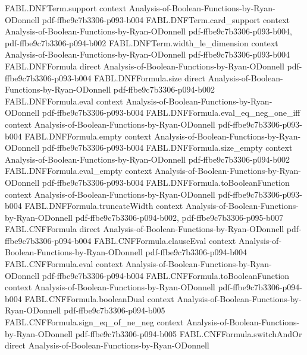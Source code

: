 \begin{theorem}
\proofstep
  {FABL.DNFTerm.support}
  {context}
  {Analysis-of-Boolean-Functions-by-Ryan-ODonnell}
  {pdf-ffbe9c7b3306-p093-b004}
\proofstep
  {FABL.DNFTerm.card_support}
  {context}
  {Analysis-of-Boolean-Functions-by-Ryan-ODonnell}
  {pdf-ffbe9c7b3306-p093-b004,
    pdf-ffbe9c7b3306-p094-b002}
\proofstep
  {FABL.DNFTerm.width_le_dimension}
  {context}
  {Analysis-of-Boolean-Functions-by-Ryan-ODonnell}
  {pdf-ffbe9c7b3306-p093-b004}
\proofstep
  {FABL.DNFFormula}
  {direct}
  {Analysis-of-Boolean-Functions-by-Ryan-ODonnell}
  {pdf-ffbe9c7b3306-p093-b004}
\proofstep
  {FABL.DNFFormula.size}
  {direct}
  {Analysis-of-Boolean-Functions-by-Ryan-ODonnell}
  {pdf-ffbe9c7b3306-p094-b002}
\proofstep
  {FABL.DNFFormula.eval}
  {context}
  {Analysis-of-Boolean-Functions-by-Ryan-ODonnell}
  {pdf-ffbe9c7b3306-p093-b004}
\proofstep
  {FABL.DNFFormula.eval_eq_neg_one_iff}
  {context}
  {Analysis-of-Boolean-Functions-by-Ryan-ODonnell}
  {pdf-ffbe9c7b3306-p093-b004}
\proofstep
  {FABL.DNFFormula.empty}
  {context}
  {Analysis-of-Boolean-Functions-by-Ryan-ODonnell}
  {pdf-ffbe9c7b3306-p093-b004}
\proofstep
  {FABL.DNFFormula.size_empty}
  {context}
  {Analysis-of-Boolean-Functions-by-Ryan-ODonnell}
  {pdf-ffbe9c7b3306-p094-b002}
\proofstep
  {FABL.DNFFormula.eval_empty}
  {context}
  {Analysis-of-Boolean-Functions-by-Ryan-ODonnell}
  {pdf-ffbe9c7b3306-p093-b004}
\proofstep
  {FABL.DNFFormula.toBooleanFunction}
  {context}
  {Analysis-of-Boolean-Functions-by-Ryan-ODonnell}
  {pdf-ffbe9c7b3306-p093-b004}
\proofstep
  {FABL.DNFFormula.truncateWidth}
  {context}
  {Analysis-of-Boolean-Functions-by-Ryan-ODonnell}
  {pdf-ffbe9c7b3306-p094-b002,
    pdf-ffbe9c7b3306-p095-b007}
\proofstep
  {FABL.CNFFormula}
  {direct}
  {Analysis-of-Boolean-Functions-by-Ryan-ODonnell}
  {pdf-ffbe9c7b3306-p094-b004}
\proofstep
  {FABL.CNFFormula.clauseEval}
  {context}
  {Analysis-of-Boolean-Functions-by-Ryan-ODonnell}
  {pdf-ffbe9c7b3306-p094-b004}
\proofstep
  {FABL.CNFFormula.eval}
  {context}
  {Analysis-of-Boolean-Functions-by-Ryan-ODonnell}
  {pdf-ffbe9c7b3306-p094-b004}
\proofstep
  {FABL.CNFFormula.toBooleanFunction}
  {context}
  {Analysis-of-Boolean-Functions-by-Ryan-ODonnell}
  {pdf-ffbe9c7b3306-p094-b004}
\proofstep
  {FABL.CNFFormula.booleanDual}
  {context}
  {Analysis-of-Boolean-Functions-by-Ryan-ODonnell}
  {pdf-ffbe9c7b3306-p094-b005}
\proofstep
  {FABL.CNFFormula.sign_eq_of_ne_neg}
  {context}
  {Analysis-of-Boolean-Functions-by-Ryan-ODonnell}
  {pdf-ffbe9c7b3306-p094-b005}
\proofstep
  {FABL.CNFFormula.switchAndOr}
  {direct}
  {Analysis-of-Boolean-Functions-by-Ryan-ODonnell}

\end{theorem}
